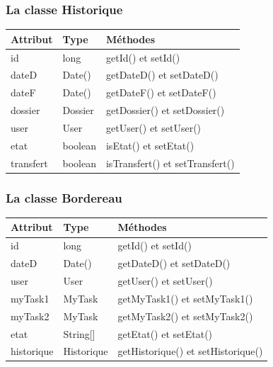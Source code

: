 \subsubsection*{La classe Historique}
\begin{table}[H]
	\centering\setlength\tabcolsep{1cm}
	
	\begin{tabular}{|l|l|l|}
		\hline
		\textbf{Attribut}  & \textbf{Type} & \multicolumn{1}{l|}{\textbf{Méthodes}} \\ \hline
		
		id & long & getId() et setId()\\ \cline{1-2}
		dateD & Date() & getDateD() et setDateD()\\ \cline{1-2}
		
				dateF & Date() & getDateF() et setDateF()\\ \cline{1-2}
				
				dossier & Dossier & getDossier() et setDossier()\\ \cline{1-2}
				
					user & User & getUser() et setUser()\\ \cline{1-2}
					
					etat & boolean & isEtat() et setEtat()\\ \cline{1-2}
				transfert & boolean & isTransfert() et setTransfert()\\ \hline
	\end{tabular}
\end{table}
 
   
   \subsubsection*{La classe Bordereau}
   \begin{table}[H]
   	\centering\setlength\tabcolsep{1cm}
   	
   	\begin{tabular}{|l|l|l|}
   		\hline
   		\textbf{Attribut}  & \textbf{Type} & \multicolumn{1}{l|}{\textbf{Méthodes}} \\ \hline
   		
   		id & long & getId() et setId()\\ \cline{1-2}
   		dateD & Date() & getDateD() et setDateD()\\ \cline{1-2}
   	    
   	    user & User & getUser() et setUser()\\ \cline{1-2}
   				myTask1 & MyTask  & getMyTask1() et setMyTask1()   \\ \cline{1-2}
   						myTask2 & MyTask  & getMyTask2() et setMyTask2() \\ \cline{1-2}  
   		etat & String[] & getEtat() et setEtat()\\ \cline{1-2}
		historique & Historique & getHistorique() et setHistorique()\\ \hline
   	\end{tabular}
   \end{table}
